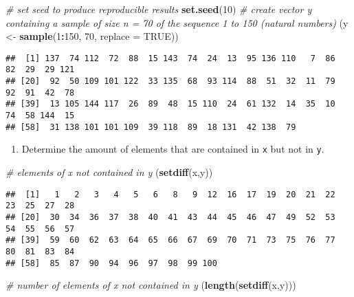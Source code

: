 \documentclass[
]{article}
\newenvironment{Shaded}{\begin{snugshade}}{\end{snugshade}}
\newcommand{\CommentTok}[1]{\textcolor[rgb]{0.56,0.35,0.01}{\textit{#1}}}
\newcommand{\DataTypeTok}[1]{\textcolor[rgb]{0.13,0.29,0.53}{#1}}
\newcommand{\DecValTok}[1]{\textcolor[rgb]{0.00,0.00,0.81}{#1}}
\newcommand{\KeywordTok}[1]{\textcolor[rgb]{0.13,0.29,0.53}{\textbf{#1}}}
\newcommand{\NormalTok}[1]{#1}
\newcommand{\OperatorTok}[1]{\textcolor[rgb]{0.81,0.36,0.00}{\textbf{#1}}}
\newcommand{\OtherTok}[1]{\textcolor[rgb]{0.56,0.35,0.01}{#1}}
\newcommand{\StringTok}[1]{\textcolor[rgb]{0.31,0.60,0.02}{#1}}
\providecommand{\tightlist}{%
  \setlength{\itemsep}{0pt}\setlength{\parskip}{0pt}}
\begin{document}
\begin{Shaded}
\begin{Highlighting}[]
\CommentTok{# set seed to produce reproducible results}
\KeywordTok{set.seed}\NormalTok{(}\DecValTok{10}\NormalTok{)}
\CommentTok{# create vector y containing a sample of size n = 70 of the sequence 1 to 150 (natural numbers)}
\NormalTok{(y <-}\StringTok{ }\KeywordTok{sample}\NormalTok{(}\DecValTok{1}\OperatorTok{:}\DecValTok{150}\NormalTok{, }\DecValTok{70}\NormalTok{, }\DataTypeTok{replace =} \OtherTok{TRUE}\NormalTok{))}
\end{Highlighting}
\end{Shaded}

\begin{verbatim}
##  [1] 137  74 112  72  88  15 143  74  24  13  95 136 110   7  86  82  29  29 121
## [20]  92  50 109 101 122  33 135  68  93 114  88  51  32  11  79  92  91  42  78
## [39]  13 105 144 117  26  89  48  15 110  24  61 132  14  35  10  74  58 144  15
## [58]  31 138 101 101 109  39 118  89  18 131  42 138  79
\end{verbatim}

\begin{enumerate}
\def\labelenumi{\arabic{enumi}.}
\setcounter{enumi}{1}
\tightlist
\item
  Determine the amount of elements that are contained in \texttt{x} but
  not in \texttt{y}.
\end{enumerate}

\begin{Shaded}
\begin{Highlighting}[]
\CommentTok{# elements of x not contained in y}
\NormalTok{(}\KeywordTok{setdiff}\NormalTok{(x,y))}
\end{Highlighting}
\end{Shaded}

\begin{verbatim}
##  [1]   1   2   3   4   5   6   8   9  12  16  17  19  20  21  22  23  25  27  28
## [20]  30  34  36  37  38  40  41  43  44  45  46  47  49  52  53  54  55  56  57
## [39]  59  60  62  63  64  65  66  67  69  70  71  73  75  76  77  80  81  83  84
## [58]  85  87  90  94  96  97  98  99 100
\end{verbatim}

\begin{Shaded}
\begin{Highlighting}[]
\CommentTok{# number of elements of x not contained in y}
\NormalTok{(}\KeywordTok{length}\NormalTok{(}\KeywordTok{setdiff}\NormalTok{(x,y)))}
\end{Highlighting}
\end{Shaded}
\end{document}

